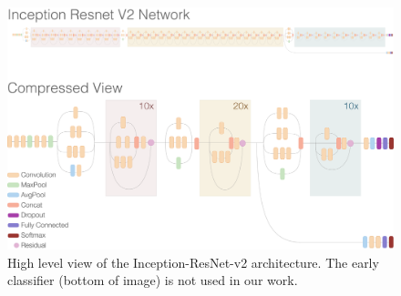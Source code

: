 \documentclass[12pt]{article}
\numberwithin{equation}{section}
\numberwithin{figure}{section}
\begin{document}
\begin{figure}
	\centering
	\captionsetup{justification=centering}
	\includegraphics[scale=0.25]{inception_resnetv2.png}
	\caption{High level view of the Inception-ResNet-v2 architecture. The early classifier (bottom of image) is not used in our work.}
	\label{fig:incepresnetv2}
\end{figure}
\end{document}
